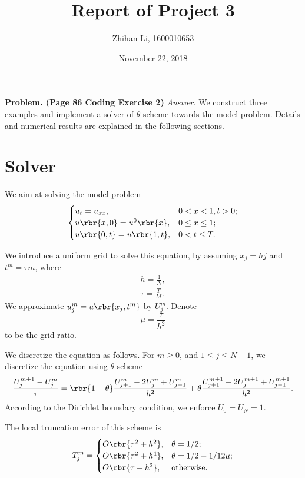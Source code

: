 \documentclass[english, nochinese]{pnote}
\title{Report of Project 3}
\author{Zhihan Li, 1600010653}
\date{November 22, 2018}
\begin{document}
\maketitle

\textbf{Problem. (Page 86 Coding Exercise 2)} \textit{Answer.} We construct three examples and implement a solver of $\theta$-scheme towards the model problem. Details and numerical results are explained in the following sections.

\section{Solver}

We aim at solving the model problem
\begin{equation}
\begin{cases}
u_t = u_{ x x }, & 0 < x < 1, t > 0; \\
u \rbr{ x, 0 } = u^0 \rbr{x}, & 0 \le x \le 1; \\
u \rbr{ 0, t } = u \rbr{ 1, t }, & 0 < t \le T.
\end{cases}
\end{equation}

We introduce a uniform grid to solve this equation, by assuming $ x_j = h j $ and $ t^m = \tau m $, where
\begin{gather}
h = \frac{1}{N}, \\
\tau = \frac{T}{M}.
\end{gather}
We approximate $ u_j^m = u \rbr{ x_j, t^m } $ by $U_j^m$. Denote
\begin{equation}
\mu = \frac{\tau}{h^2}
\end{equation}
to be the grid ratio.

We discretize the equation as follows. For $ m \ge 0 $, and $ 1 \le j \le N - 1 $, we discretize the equation using $\theta$-scheme
\begin{equation}
\frac{ U_j^{ m + 1 } - U_j^m }{\tau} = \rbr{ 1 - \theta } \frac{ U_{ j + 1 }^m - 2 U_j^m + U_{ j - 1 }^m }{h^2} + \theta \frac{ U_{ j + 1 }^{ m + 1 } - 2 U_j^{ m + 1 } + U_{ j - 1 }^{ m + 1 } }{h^2}.
\end{equation}
According to the Dirichlet boundary condition, we enforce $ U_0 = U_N = 1 $.

The local truncation error of this scheme is
\begin{equation}
T_j^m =
\begin{cases}
O \rbr{ \tau^2 + h^2 }, & \theta = 1 / 2; \\
O \rbr{ \tau^2 + h^4 }, & \theta = 1 / 2 - 1 / 12 \mu; \\
O \rbr{ \tau + h^2 }, & \text{otherwise}.
\end{cases}
\end{equation}
\end{document}
